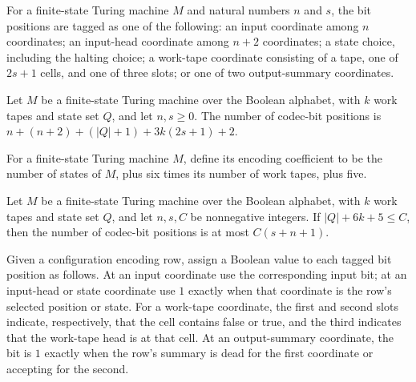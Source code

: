 \begin{definition}
\label{Complexity.CodecBit}
\leanok
{}
For a finite-state Turing machine $M$ and natural numbers $n$ and $s$, the bit positions
are tagged as one of the following: an input coordinate among $n$ coordinates; an
input-head coordinate among $n+2$ coordinates; a state choice, including the halting
choice; a work-tape coordinate consisting of a tape, one of $2s+1$ cells, and one of
three slots; or one of two output-summary coordinates.
\end{definition}

\begin{theorem}
\label{Complexity.codecBit_card}
\leanok
{}
Let $M$ be a finite-state Turing machine over the Boolean alphabet, with $k$ work tapes
and state set $Q$, and let $n,s\ge 0$. The number of codec-bit positions is
$n+(n+2)+(|Q|+1)+3k(2s+1)+2$.
\end{theorem}

\begin{definition}
\label{Complexity.codecCoefficient}
\leanok
{}
For a finite-state Turing machine $M$, define its encoding coefficient to be the number
of states of $M$, plus six times its number of work tapes, plus five.
\end{definition}

\begin{theorem}
\label{Complexity.codecBit_card_le}
\leanok
{}
Let $M$ be a finite-state Turing machine over the Boolean alphabet, with $k$ work tapes
and state set $Q$, and let $n,s,C$ be nonnegative integers. If $|Q|+6k+5\le C$, then the
number of codec-bit positions is at most $C(s+n+1)$.
\end{theorem}

\begin{definition}
\label{Complexity.codecRowBits}
\leanok
{}
Given a configuration encoding row, assign a Boolean value to each tagged bit position
as follows. At an input coordinate use the corresponding input bit; at an input-head or
state coordinate use $1$ exactly when that coordinate is the row's selected position or
state. For a work-tape coordinate, the first and second slots indicate, respectively,
that the cell contains false or true, and the third indicates that the work-tape head is
at that cell. At an output-summary coordinate, the bit is $1$ exactly when the row's
summary is dead for the first coordinate or accepting for the second.
\end{definition}

